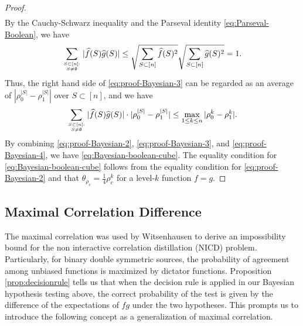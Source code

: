 \documentclass[journal,draftcls, onecolumn]{IEEEtran}
\begin{document}
\begin{proof}
\begin{align}
\end{align}
By the Cauchy-Schwarz inequality and the Parseval identity \eqref{eq:Parseval-Boolean}, we have
\begin{align*}
\sum_{S \subset [n]: \atop S \neq \emptyset} | \widehat{f}(S) \widehat{g}(S)| \le \sqrt{ \sum_{S\subset[n]} \widehat{f}(S)^2 }
\sqrt{ \sum_{S \subset [n]} \widehat{g}(S)^2 } =1.
\end{align*}
Thus, the right hand side of \eqref{eq:proof-Bayesian-3} can be regarded as an average of
$| \rho_0^{|S|}-\rho_1^{|S|}|$ over $S \subset [n]$, and we have
\begin{align} \label{eq:proof-Bayesian-4}
\sum_{S \subset [n]: \atop S \neq \emptyset} | \widehat{f}(S) \widehat{g}(S)| \cdot | \rho_0^{|S|}-\rho_1^{|S|}|
\le \max_{1\le k \le n} |\rho_0^k - \rho_1^k|.
\end{align}
By combining \eqref{eq:proof-Bayesian-2}, \eqref{eq:proof-Bayesian-3}, and \eqref{eq:proof-Bayesian-4},  
we have \eqref{eq:Bayesian-boolean-cube}. The equality condition for \eqref{eq:Bayesian-boolean-cube}
follows from the equality condition for \eqref{eq:proof-Bayesian-2} and that $\theta_{\rho_c} = \frac{1}{4} \rho_c^k$
for a level-$k$ function $f=g$.
\end{proof}


\subsection{Maximal Correlation Difference} \label{subsec:MCD}

The maximal correlation was used by Witsenhausen \cite{witsenhausen:75} to derive an impossibility bound for the non interactive correlation distillation (NICD) problem.
Particularly, for binary double symmetric sources, the probability of agreement among
unbiased functions is maximized by dictator functions. 
Proposition \ref{prop:decisionrule} tells us that when the decision rule is applied in our Bayesian hypothesis testing above, the correct probability of the test 
is given by the difference of the expectations of $fg$ under the two hypotheses.  This prompts us to introduce the following concept as a generalization of maximal correlation.

\end{document}
